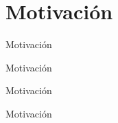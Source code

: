 \section{Motivación}

\begin{frame}{Motivación}
	\begin{center}
		
	\end{center}
\end{frame}
\begin{frame}{Motivación}
	\begin{center}
		
	\end{center}
\end{frame}
\begin{frame}{Motivación}
	\begin{center}
		
	\end{center}
\end{frame}
\begin{frame}{Motivación}
	\begin{center}
		
	\end{center}
\end{frame}